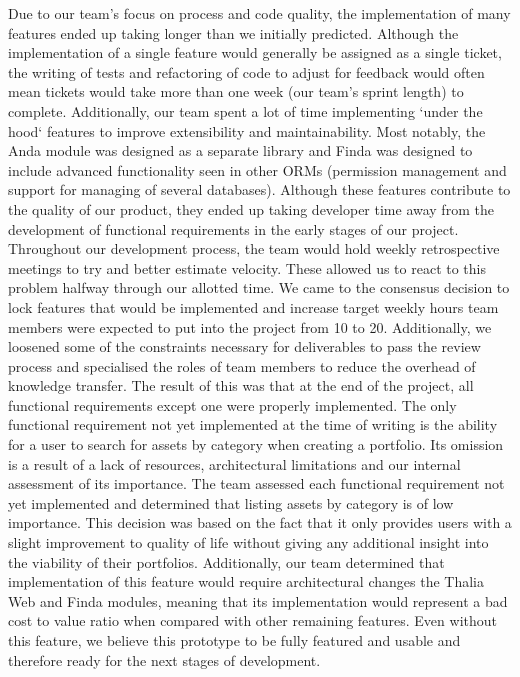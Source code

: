 \documentclass[main.tex]{subfiles}
\begin{document}
Due to our team's focus on process and code quality, the implementation of many features ended up taking longer than we initially predicted. Although the implementation of a single feature would generally be assigned as a single ticket, the writing of tests and refactoring of code to adjust for feedback would often mean tickets would take more than one week (our team's sprint length) to complete. Additionally, our team spent a lot of time implementing `under the hood` features to improve extensibility and maintainability. Most notably, the Anda module was designed as a separate library and Finda was designed to include advanced functionality seen in other ORMs (permission management and support for managing of several databases). Although these features contribute to the quality of our product, they ended up taking developer time away from the development of functional requirements in the early stages of our project.
Throughout our development process, the team would hold weekly retrospective meetings to try and better estimate velocity. These allowed us to react to this problem halfway through our allotted time. We came to the consensus decision to lock features that would be implemented and increase target weekly hours team members were expected to put into the project from 10 to 20. Additionally, we loosened some of the constraints necessary for deliverables to pass the review process and specialised the roles of team members to reduce the overhead of knowledge transfer. The result of this was that at the end of the project, all functional requirements except one were properly implemented.
The only functional requirement not yet implemented at the time of writing is the ability for a user to search for assets by category when creating a portfolio. Its omission is a result of a lack of resources, architectural limitations and our internal assessment of its importance. The team assessed each functional requirement not yet implemented and determined that listing assets by category is of low importance. This decision was based on the fact that it only provides users with a slight improvement to quality of life without giving any additional insight into the viability of their portfolios. Additionally, our team determined that implementation of this feature would require architectural changes the Thalia Web and Finda modules, meaning that its implementation would represent a bad cost to value ratio when compared with other remaining features. 
Even without this feature, we believe this prototype to be fully featured and usable and therefore ready for the next stages of development.
\end{document}
